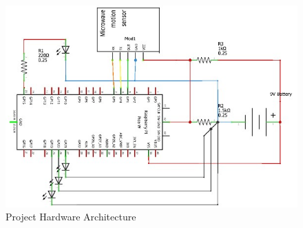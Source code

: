 \begin{figure}[htbp]
    \centering
    \includegraphics[width=\linewidth, angle=-90]{images/hardwarearchitecture}
    \caption{Project Hardware Architecture}
    \label{fig:hardwareArchitecture}
\end{figure}
